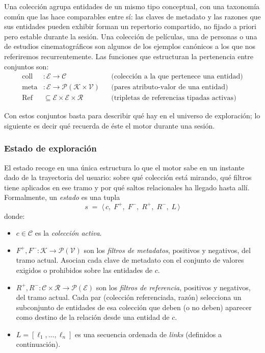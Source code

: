Una colección agrupa entidades de un mismo tipo conceptual, con una taxonomía común que las hace
comparables entre sí: las claves de metadato y las razones que sus entidades pueden exhibir forman un
repertorio compartido, no fijado a priori pero estable durante la sesión. Una colección de películas, una
de personas o una de estudios cinematográficos son algunos de los ejemplos canónicos a los que nos referiremos recurrentemente. 
Las funciones que estructuran la pertenencia entre conjuntos son:
\begin{align*}
  \mathrm{coll} &: \mathcal{E} \to \mathcal{C} & &\text{(colección a la que pertenece una entidad)}\\
  \mathrm{meta} &: \mathcal{E} \to \mathcal{P}(\mathcal{K} \times \mathcal{V}) & &\text{(pares atributo-valor de una entidad)}\\
  \mathrm{Ref} &\subseteq \mathcal{E} \times \mathcal{E} \times \mathcal{R} & &\text{(tripletas de referencias tipadas activas)}
\end{align*}

Con estos conjuntos basta para describir qué hay en el universo de exploración; lo siguiente es decir qué
recuerda de éste el motor durante una sesión.

\subsubsection*{Estado de exploración}

El estado recoge en una única estructura lo que el motor sabe en un instante dado de la trayectoria del
usuario: sobre qué colección está mirando, qué filtros tiene aplicados en ese tramo y por qué saltos
relacionales ha llegado hasta allí. Formalmente, un \emph{estado} es una tupla
\[
  s \;=\; \langle\, c,\; F^{+},\; F^{-},\; R^{+},\; R^{-},\; L \,\rangle
\]
donde:
\begin{itemize}
  \item $c \in \mathcal{C}$ es la \emph{colección activa}.
  \item $F^{+}, F^{-} : \mathcal{K} \to \mathcal{P}(\mathcal{V})$ son los \emph{filtros de metadatos},
    positivos y negativos, del tramo actual. Asocian cada clave de metadato con el conjunto de valores
    exigidos o prohibidos sobre las entidades de $c$.
  \item $R^{+}, R^{-} : \mathcal{C} \times \mathcal{R} \to \mathcal{P}(\mathcal{E})$ son los
    \emph{filtros de referencia}, positivos y negativos, del tramo actual. Cada par
    (colección referenciada, razón) selecciona un subconjunto de entidades de esa colección que deben (o no
    deben) aparecer como destino de la relación desde una entidad de $c$.
  \item $L = [\ell_{1}, \ldots, \ell_{n}]$ es una secuencia ordenada de \emph{links} (definidos a continuación).
\end{itemize}

